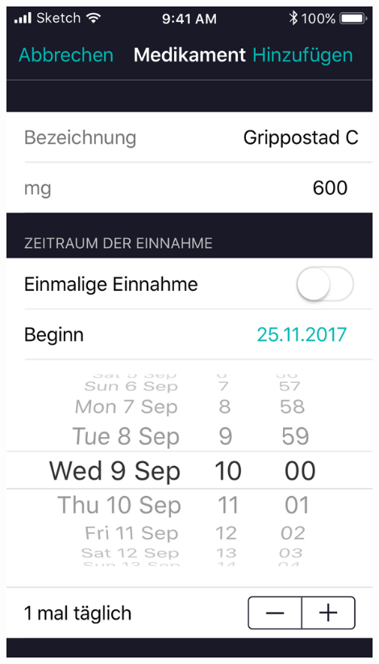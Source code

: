 \documentclass[a4paper]{scrreprt}
\begin{document}
\begin{minipage}[t][][b]{0.4\textwidth}
\includegraphics[width=0.9\textwidth]{mockups/NewMed}

\end{minipage}%
\hfill
\end{document}
